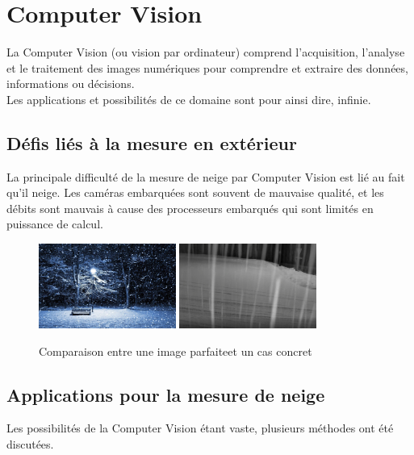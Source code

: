 \section{Computer Vision}
La Computer Vision (ou vision par ordinateur) comprend l'acquisition, l'analyse et
le traitement des images numériques pour comprendre et extraire des données, informations
ou décisions.\\
Les applications et possibilités de ce domaine sont pour ainsi dire, infinie.

\subsection{Défis liés à la mesure en extérieur}
La principale difficulté de la mesure de neige par Computer Vision est lié au fait
qu'il neige. Les caméras embarquées sont souvent de mauvaise qualité, et les débits
sont mauvais à cause des processeurs embarqués qui sont limités en puissance de calcul.

\begin{figure}[H]
    \centering
    \includegraphics[width=0.4\textwidth]{Images/computer_vision/perfect_snow.jpg}
    \includegraphics[width=0.4\textwidth]{Images/computer_vision/real_snow.png}
    \caption[]{Comparaison entre une image parfaite\footnotemark[1] et un cas concret\footnotemark[2]}
    \label{Snow comparison}
\end{figure}
\newpage

\subsection{Applications pour la mesure de neige}
Les possibilités de la Computer Vision étant vaste, plusieurs méthodes ont été discutées.

